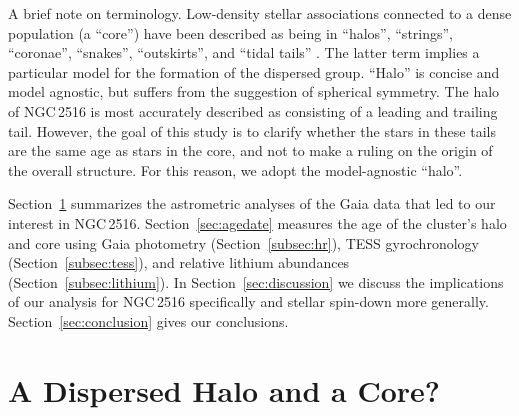 \documentclass[12pt,twocolumn,tighten]{aastex63}
\newcommand{\cn}{NGC\,2516} %
\begin{document}
A brief note on terminology.  Low-density stellar associations
connected to a dense population (a ``core'') have been described as
being in ``halos'', ``strings'', ``coronae'', ``snakes'',
``outskirts'', and ``tidal tails'' \citep[{\it
e.g.},][]{davenport_death_2010,kounkel_untangling_2019,roser_hyades_2019,tian_discovery_2020,meingast_2021}.
The latter term implies a particular model for the formation of the
dispersed group.  ``Halo'' is concise and model agnostic, but suffers
from the suggestion of spherical symmetry.  The halo of NGC\,2516 is
most accurately described as consisting of a leading and trailing
tail. However, the goal of this study is to clarify whether the stars
in these tails are the same age as stars in the core, and not to make
a ruling on the origin of the overall structure.  For this reason, we
adopt the model-agnostic ``halo''.

Section~\ref{sec:gaia} summarizes the astrometric analyses of the Gaia
data that led to our interest in \cn.  Section~\ref{sec:agedate}
measures the age of the cluster's halo and core using Gaia photometry
(Section~\ref{subsec:hr}), TESS gyrochronology
(Section~\ref{subsec:tess}), and relative lithium abundances
(Section~\ref{subsec:lithium}).  In Section~\ref{sec:discussion} we
discuss the implications of our analysis for NGC\,2516 specifically
and stellar spin-down more generally.
Section~\ref{sec:conclusion} gives our conclusions.


\section{A Dispersed Halo and a Core?}
\label{sec:gaia}
\end{document}
